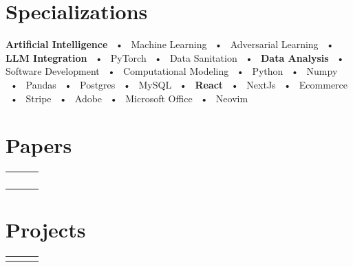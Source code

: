 \documentclass[jdlanctot]{mycv}
\begin{document}
\begin{paracol}{2}
\begin{minipage}[t]{0.22\textwidth}
\section*{Specializations}
\textbf{Artificial Intelligence} ~•~ Machine Learning ~•~ Adversarial Learning ~•~ \textbf{LLM Integration} ~•~ PyTorch ~•~ Data Sanitation ~•~ \textbf{Data Analysis} ~•~ Software Development ~•~ Computational Modeling ~•~ Python ~•~ Numpy ~•~ Pandas ~•~ Postgres ~•~ MySQL ~•~ \textbf{React} ~•~ NextJs ~•~ Ecommerce ~•~ Stripe ~•~ Adobe ~•~ Microsoft Office ~•~ Neovim
\end{minipage}
\vspace{4em}

\phantom{turn the page}

\phantom{turn the page}
\switchcolumn
\small
\section*{Papers}
\begin{tabular}{r!{\hspace{2mm}\color{titlerulecolour}\vrule width 1pt\hspace{1mm}} p{0.5\textwidth} c}
    \\
    \\
    \\
    \\
    \vspace{-1em}
\end{tabular}

\section*{Projects}
\begin{tabular}{r!{\hspace{2mm}\color{titlerulecolour}\vrule width 1pt\hspace{1mm}} p{0.5\textwidth} c}
    \\
    \vspace{-3em}
\end{tabular}
\vspace{1em}

\end{paracol}
\end{document}
